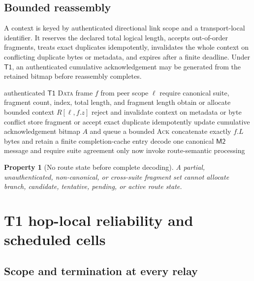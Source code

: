 \documentclass[11pt,oneside]{article}
\newcommand{\Mtwo}{\ensuremath{\mathsf{M2}}}
\newcommand{\Wtwo}{\ensuremath{\mathsf{W2}}}
\newcommand{\Tone}{\ensuremath{\mathsf{T1}}}
\newtheorem{property}{Property}
\begin{document}
\subsection{Bounded reassembly}

A context is keyed by authenticated directional link scope and a transport-local identifier. It reserves the declared total logical length, accepts out-of-order fragments, treats exact duplicates idempotently, invalidates the whole context on conflicting duplicate bytes or metadata, and expires after a finite deadline. Under \Tone{}, an authenticated cumulative acknowledgement may be generated from the retained bitmap before reassembly completes.

\begin{algorithm}[ht]
\caption{Bounded \Mtwo{}/\Wtwo{} reassembly pipeline}
\label{alg:reassembly}
\begin{algorithmic}[1]
\Require authenticated \Tone{} \textsc{Data} frame $f$ from peer scope $\ell$
\State require canonical suite, fragment count, index, total length, and fragment length
\State obtain or allocate bounded context $R[\ell,f.z]$
\State reject and invalidate context on metadata or byte conflict
\State store fragment or accept exact duplicate idempotently
\State update cumulative acknowledgement bitmap $A$ and queue a bounded \textsc{Ack}
  \State concatenate exactly $f.L$ bytes and retain a finite completion-cache entry
  \State decode one canonical \Mtwo{} message and require suite agreement
  \State only now invoke route-semantic processing
\EndIf
\end{algorithmic}
\end{algorithm}

\begin{property}[No route state before complete decoding]
A partial, unauthenticated, non-canonical, or cross-suite fragment set cannot allocate branch, candidate, tentative, pending, or active route state.
\end{property}

\section{T1 hop-local reliability and scheduled cells}
\label{sec:t1}

\subsection{Scope and termination at every relay}
\end{document}
